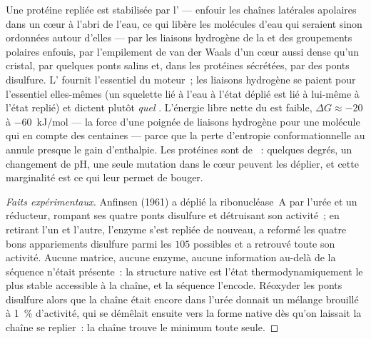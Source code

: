 \begin{proposition}\label{prop:b3:structural-biology:forces}
Une protéine repliée est stabilisée par l'\emph{} ---
enfouir les chaînes latérales apolaires dans un cœur à l'abri de l'eau,
ce qui libère les molécules d'eau qui seraient sinon ordonnées autour
d'elles --- par les liaisons hydrogène de la  et
des groupements polaires enfouis, par l'empilement de van der Waals
d'un cœur aussi dense qu'un cristal, par quelques ponts salins et, dans
les protéines sécrétées, par des ponts disulfure. L'
fournit l'essentiel du moteur~; les liaisons hydrogène se paient pour
l'essentiel elles-mêmes (un squelette lié à l'eau à l'état déplié est
lié à lui-même à l'état replié) et dictent plutôt \emph{quel}
. L'énergie libre nette du  est faible,
$\Delta G \approx -20$ à \qty{-60}{kJ/mol} --- la force d'une poignée
de liaisons hydrogène pour une molécule qui en compte des centaines ---
parce que la perte d'entropie conformationnelle au  annule
presque le gain d'enthalpie. Les protéines sont de
\emph{}~: quelques degrés, un changement de pH, une
seule mutation dans le cœur peuvent les déplier, et cette marginalité
est ce qui leur permet de bouger.
\end{proposition}

\begin{proof}[Faits expérimentaux]
Anfinsen (1961) a déplié la ribonucléase~A par l'urée et un réducteur,
rompant ses quatre ponts disulfure et détruisant son activité~; en
retirant l'un et l'autre, l'enzyme s'est repliée de nouveau, a reformé
les quatre bons appariements disulfure parmi les $105$ possibles et a
retrouvé toute son activité. Aucune matrice, aucune enzyme, aucune
information au-delà de la séquence n'était présente~: la structure
native est l'état thermodynamiquement le plus stable accessible à la
chaîne, et la séquence l'encode. Réoxyder les ponts disulfure alors que
la chaîne était encore dans l'urée donnait un mélange brouillé à
\qty{1}{\%} d'activité, qui se démêlait ensuite vers la forme native
dès qu'on laissait la chaîne se replier~: la chaîne trouve le minimum
toute seule.
\end{proof}

